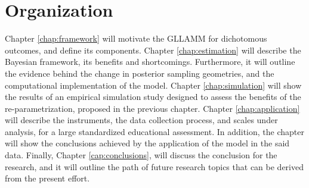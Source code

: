 \section{Organization}

Chapter \ref{chap:framework} will motivate the GLLAMM for dichotomous outcomes, and define its components. Chapter \ref{chap:estimation} will describe the Bayesian framework, its benefits and shortcomings. Furthermore, it will outline the evidence behind the change in posterior sampling geometries, and the computational implementation of the model. Chapter \ref{chap:simulation} will show the results of an empirical simulation study designed to assess the benefits of the re-parametrization, proposed in the previous chapter. Chapter \ref{chap:application} will describe the instruments, the data collection process, and scales under analysis, for a large standardized educational assessment. In addition, the chapter will show the conclusions achieved by the application of the model in the said data. Finally, Chapter \ref{cap:conclusions}, will discuss the conclusion for the research, and it will outline the path of future research topics that can be derived from the present effort.
